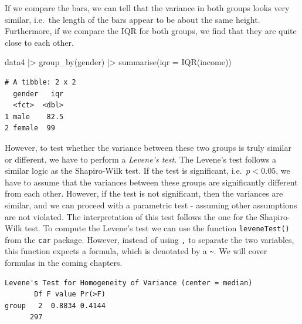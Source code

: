 \documentclass[
  letterpaper,
]{krantz}
\makeatletter
\newenvironment{Shaded}{\begin{snugshade}}{\end{snugshade}}
\newcommand{\AttributeTok}[1]{\textcolor[rgb]{0.40,0.45,0.13}{#1}}
\newcommand{\FunctionTok}[1]{\textcolor[rgb]{0.28,0.35,0.67}{#1}}
\newcommand{\NormalTok}[1]{\textcolor[rgb]{0.00,0.23,0.31}{#1}}
\newcommand{\SpecialCharTok}[1]{\textcolor[rgb]{0.37,0.37,0.37}{#1}}
\newenvironment{kframe}{%
\medskip{}
\setlength{\fboxsep}{.8em}
 \def\at@end@of@kframe{}%
 \ifinner\ifhmode%
  \def\at@end@of@kframe{\end{minipage}}%
  \begin{minipage}{\columnwidth}%
 \fi\fi%
 \def\FrameCommand##1{\hskip\@totalleftmargin \hskip-\fboxsep
 \colorbox{shadecolor}{##1}\hskip-\fboxsep
     \hskip-\linewidth \hskip-\@totalleftmargin \hskip\columnwidth}%
 \MakeFramed {\advance\hsize-\width
   \@totalleftmargin\z@ \linewidth\hsize
   \@setminipage}}%
 {\par\unskip\endMakeFramed%
 \at@end@of@kframe}
\renewenvironment{Shaded}{\begin{kframe}}{\end{kframe}}
\makeatother
\begin{document}
If we compare the bars, we can tell that the variance in both groups
looks very similar, i.e.~the length of the bars appear to be about the
same height. Furthermore, if we compare the IQR for both groups, we find
that they are quite close to each other.

\begin{Shaded}
\begin{Highlighting}[]
\NormalTok{data4 }\SpecialCharTok{|\textgreater{}}
  \FunctionTok{group\_by}\NormalTok{(gender) }\SpecialCharTok{|\textgreater{}}
  \FunctionTok{summarise}\NormalTok{(}\AttributeTok{iqr =} \FunctionTok{IQR}\NormalTok{(income))}
\end{Highlighting}
\end{Shaded}

\begin{verbatim}
# A tibble: 2 x 2
  gender   iqr
  <fct>  <dbl>
1 male    82.5
2 female  99  
\end{verbatim}

However, to test whether the variance between these two groups is truly
similar or different, we have to perform a \emph{Levene's test}. The
Levene's test follows a similar logic as the Shapiro-Wilk test. If the
test is significant, i.e.~\(p < 0.05\), we have to assume that the
variances between these groups are significantly different from each
other. However, if the test is not significant, then the variances are
similar, and we can proceed with a parametric test - assuming other
assumptions are not violated. The interpretation of this test follows
the one for the Shapiro-Wilk test. To compute the Levene's test we can
use the function \texttt{leveneTest()} from the \texttt{car} package.
However, instead of using \texttt{,} to separate the two variables, this
function expects a formula, which is denotated by a
\texttt{\textasciitilde{}}. We will cover formulas in the coming
chapters.

\begin{Shaded}
\end{Shaded}

\begin{verbatim}
Levene's Test for Homogeneity of Variance (center = median)
       Df F value Pr(>F)
group   2  0.8834 0.4144
      297               
\end{verbatim}
\end{document}
